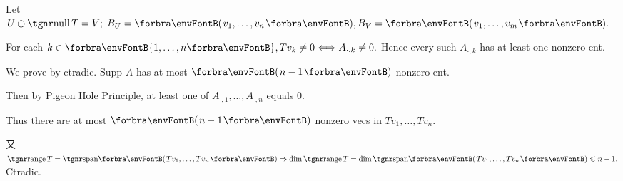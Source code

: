 

\par\quad
Let $U\oplus\null T=V;\;B_U=\Par{v_1,\dots,v_n},B_V=\Par{v_1,\dots,v_m}.$\par\quad
For each $k\in\Bra{1,\dots,n},Tv_k\neq 0\Longleftrightarrow A_{\cdot,k}\neq 0.$ Hence every such $A_{\cdot,k}$ has at least one nonzero ent.\PfEnd\vspace{4pt}\par\quad
\Or We prove by ctradic. Supp $A$ has at most $\Par{n-1}$ nonzero ent.\par\quad
Then by Pigeon Hole Principle, at least one of $A_{\cdot,1},\dots,A_{\cdot,n}$ equals $0$.\par\quad
Thus there are at most $\Par{n-1}$ nonzero vecs in $Tv_{1},\dots,Tv_n.$\par\quad
又 $\range T=\Span{Tv_{1},\dots,Tv_n}\Rightarrow\dim\range T=\dim\Span{Tv_{1},\dots,Tv_n}\leqslant n-1.$ Ctradic.\PfEnd
\SepLine

